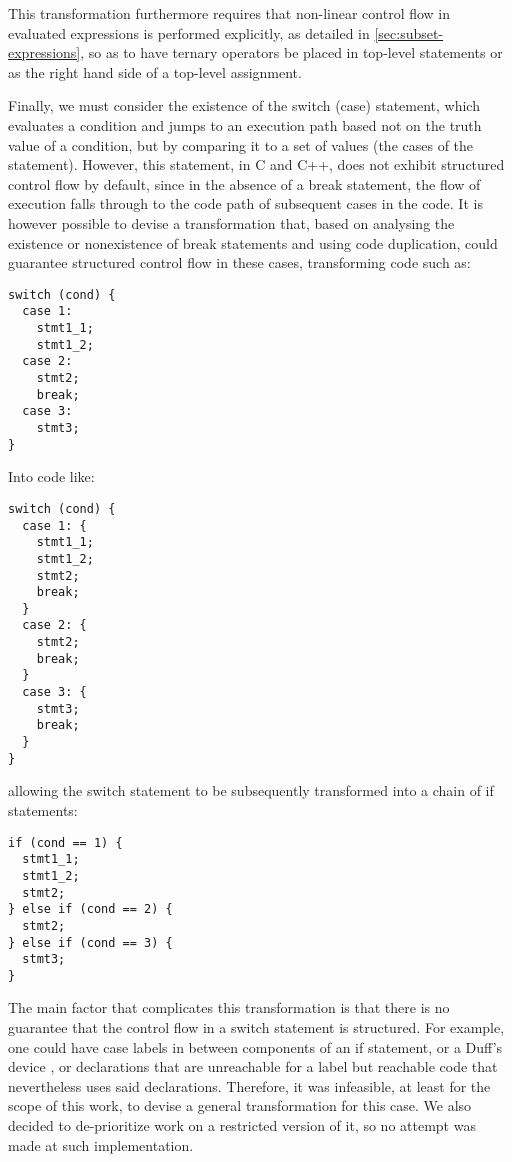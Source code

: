 This transformation furthermore requires that non-linear control flow in evaluated expressions is performed explicitly, as detailed in \ref{sec:subset-expressions}, so as to have ternary operators be placed in top-level statements or as the right hand side of a top-level assignment.

Finally, we must consider the existence of the switch (case) statement, which evaluates a condition and jumps to an execution path based not on the truth value of a condition, but by comparing it to a set of values (the cases of the statement). However, this statement, in C and C++, does not exhibit structured control flow by default, since in the absence of a break statement, the flow of execution falls through to the code path of subsequent cases in the code. It is however possible to devise a transformation that, based on analysing the existence or nonexistence of break statements and using code duplication, could guarantee structured control flow in these cases, transforming code such as:

\begin{lstlisting}
switch (cond) {
  case 1:
    stmt1_1;
    stmt1_2;
  case 2:
    stmt2;
    break;
  case 3:
    stmt3;
}
\end{lstlisting}

Into code like:

\begin{lstlisting}
switch (cond) {
  case 1: {
    stmt1_1;
    stmt1_2;
    stmt2;
    break;
  }
  case 2: {
    stmt2;
    break;
  }
  case 3: {
    stmt3;
    break;
  }
}
\end{lstlisting}

allowing the switch statement to be subsequently transformed into a chain of if statements:

\begin{lstlisting}
if (cond == 1) {
  stmt1_1;
  stmt1_2;
  stmt2;
} else if (cond == 2) {
  stmt2;
} else if (cond == 3) {
  stmt3;
}
\end{lstlisting}

The main factor that complicates this transformation is that there is no guarantee that the control flow in a switch statement is structured. For example, one could have case labels in between components of an if statement, or a Duff's device \cite{Duff1988}, or declarations that are unreachable for a label but reachable code that nevertheless uses said declarations. Therefore, it was infeasible, at least for the scope of this work, to devise a general transformation for this case. We also decided to de-prioritize work on a restricted version of it, so no attempt was made at such implementation.

